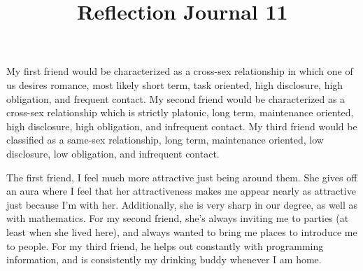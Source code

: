 \documentclass[12pt]{article}
\begin{document}
\title{Reflection Journal 11}

\par
My first friend would be characterized as a cross-sex relationship in which one of us desires romance, most likely short term, task oriented, high disclosure, high obligation, and frequent contact. My second friend would be characterized as a cross-sex relationship which is strictly platonic, long term, maintenance oriented, high disclosure, high obligation, and infrequent contact. My third friend would be classified as a same-sex relationship, long term, maintenance oriented, low disclosure, low obligation, and infrequent contact.
\par
The first friend, I feel much more attractive just being around them. She gives off an aura where I feel that her attractiveness makes me appear nearly as attractive just because I'm with her. Additionally, she is very sharp in our degree, as well as with mathematics. For my second friend, she's always inviting me to parties (at least when she lived here), and always wanted to bring me places to introduce me to people. For my third friend, he helps out constantly with programming information, and is consistently my drinking buddy whenever I am home.
\end{document}
